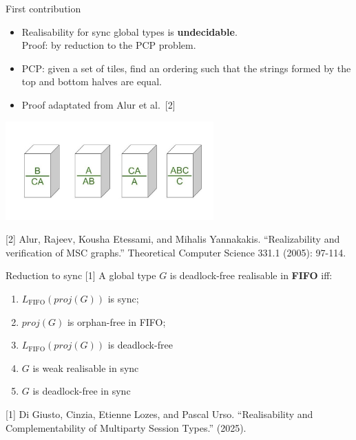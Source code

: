 \documentclass{beamer}
\begin{document}
\begin{frame}[fragile]{First contribution}

	\vspace{1em}

	\begin{itemize}
		\item Realisability for sync global types is
    \textbf{undecidable}. \\ Proof: by reduction to the PCP problem.
    \item PCP: given a set of tiles, find an ordering such that the
    strings formed by the top and bottom halves are equal.
    \item Proof adaptated from Alur et al.~[2]
	\end{itemize}

	\begin{center}
		\includegraphics[width=0.6\textwidth]{../img/pcp.jpg}
	\end{center}

	\small{[2] Alur, Rajeev, Kousha Etessami, and Mihalis Yannakakis. ``Realizability and verification of MSC graphs.'' Theoretical Computer Science 331.1 (2005): 97-114.}
\end{frame}

\begin{frame}{Reduction to sync [1]}
	\vspace{1.5cm}
	A global type $G$ is deadlock-free realisable in \textbf{FIFO} iff:
	\begin{enumerate}
		\item $L_{\text{FIFO}}(proj(G))$ is sync;
		\item $proj(G)$ is orphan-free in FIFO; %
		\item $L_{\text{FIFO}}(proj(G))$ is deadlock-free
		\item $G$ is weak realisable in sync
		\item $G$ is deadlock-free in sync \hspace{4mm} \scalebox{1.5}{{\color{red}$\longleftarrow$}}
	\end{enumerate}
	
	\vspace{1.5cm}

	\small{[1] Di Giusto, Cinzia, Etienne Lozes, and Pascal Urso. ``Realisability and Complementability of Multiparty Session Types.'' (2025).}
\end{frame}
\end{document}
